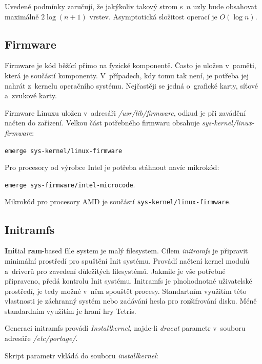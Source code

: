 \documentclass[12pt,a4paper,twoside,]{article}
\begin{document}
{{{{{{{\hspace*{-1.5em}Uvedené podmínky zaručují, že jakýkoliv takový strom s~$n$ uzly bude obsahovat \\maximálně $2\log(n+1)$ vrstev. Asymptotická složitost operací je $O(\log n)$.\\



\subsection{\textsf{Firmware}}
Firmware je kód běžící přímo na fyzické komponentě. Často je uložen v~paměti, která je součástí komponenty. V~případech, kdy tomu tak není, je potřeba jej nahrát z~kernelu operačního systému. Nejčastěji se jedná o~grafické karty, síťové a~zvukové karty. 

Firmware Linuxu uložen v~adresáři \textit{/usr/lib/firmware}, odkud je při zavádění načten do zařízení. Velkou část potřebného firmwaru obsahuje \textit{sys-kernel/linux-firmware}:

\texttt{emerge sys-kernel/linux-firmware}

\hspace{-1.5em}Pro procesory od výrobce Intel je potřeba stáhnout navíc mikrokód:

\texttt{emerge sys-firmware/intel-microcode}. 

\hspace{-1.5em}Mikrokód pro procesory AMD je součástí  \texttt{sys-kernel/linux-firmware}.
\subsection{\textsf{Initramfs}} \hypertarget{Initramfs}{}
{\bf Init}ial {\bf ram}-based {\bf f}ile {\bf s}ystem je malý filesystem. Cílem \textit{initramfs} je připravit minimální prostředí pro spuštění Init systému. Provádí načtení kernel modulů a~driverů pro zavedení důležitých filesystémů. Jakmile je vše potřebné připraveno, předá kontrolu Init systému.
Initramfs je plnohodnotné uživatelské prostředí, je tedy možné v~něm spouštět procesy. Standartním využitím této vlastnosti je záchranný systém nebo zadávání hesla pro rozšifrování disku. Méně standardním využitím je hraní hry Tetris. 

Generaci initramfs provádí \textit{Installkernel}, najde-li \textit{dracut} parametr v~souboru adresáře \textit{/etc/portage/}.

\hspace{-1.5em}Skript parametr vkládá do souboru \textit{installkernel}:

}}}}}}}
\end{document}
